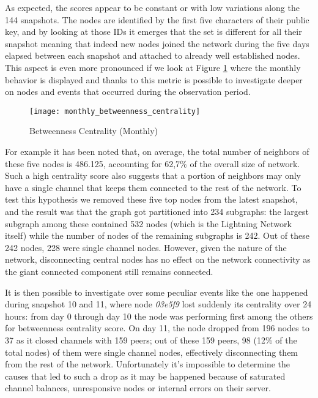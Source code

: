 	As expected, the scores appear to be constant or with low variations along the 144 snapshots. The nodes are identified by the first five characters of their public key, and by looking at those IDs it emerges that the set is different for all their snapshot meaning that indeed new nodes joined the network during the five days elapsed between each snapshot and attached to already well established nodes. This aspect is even more pronounced if we look at Figure \ref{monthly_betweenness_centrality} where the monthly behavior is displayed and thanks to this metric is possible to investigate deeper on nodes and events that occurred during the observation period. 
	
	\begin{figure}[ht!]
		\centering
		\texttt{[image: monthly\_betweenness\_centrality]}
		\caption{Betweenness Centrality (Monthly)}
		\label{monthly_betweenness_centrality}
	\end{figure}		
	
	For example it has been noted that, on average, the total number of neighbors of these five nodes is 486.125, accounting for 62,7\% of the overall size of network. Such a high centrality score also suggests that a portion of neighbors may only have a single channel that keeps them connected to the rest of the network. To test this hypothesis we removed these five top nodes from the latest snapshot, and the result was that the graph got partitioned into 234 subgraphs: the largest subgraph among these contained 532 nodes (which is the Lightning Network itself) while the number of nodes of the remaining subgraphs is 242. Out of these 242 nodes, 228 were single channel nodes. However, given the nature of the network, disconnecting central nodes has no effect on the network connectivity as the giant connected component still remains connected.

	It is then possible to investigate over some peculiar events like the one happened during snapshot 10 and 11, where node \textit{03e5f9} lost suddenly its centrality over 24 hours: 
	from day 0 through day 10 the node was performing first among the others for betweenness centrality score. On day 11, the node dropped from 196 nodes to 37 as it closed channels with 159 peers; out of these 159 peers, 98 (12\% of the total nodes) of them were single channel nodes, effectively disconnecting them from the rest of the network. Unfortunately it's impossible to determine the causes that led to such a drop as it may be happened because of saturated channel balances, unresponsive nodes or internal errors on their server.
	
